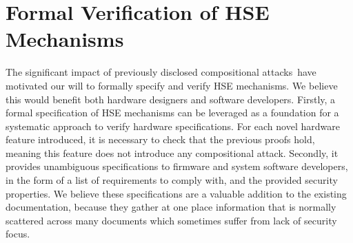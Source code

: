 \section{Formal Verification of HSE Mechanisms}
\label{sec:intro:verif}

The significant impact of previously disclosed compositional
attacks\,\cite{duflot2009smram,wojtczuk2009smram,domas2015sinkhole,kallenberg2015racecondition,kovah2015senter}
have motivated our will to formally specify and verify HSE mechanisms.
%
We believe this would benefit both hardware designers and software developers.
%
Firstly, a formal specification of HSE mechanisms can be leveraged as a
foundation for a systematic approach to verify hardware specifications.
%
For each novel hardware feature introduced, it is necessary to check that the
previous proofs hold, meaning this feature does not introduce any compositional
attack.
%
Secondly, it provides unambiguous specifications to firmware and system software
developers, in the form of a list of requirements to comply with, and the
provided security properties.
%
We believe these specifications are a valuable addition to the existing
documentation, because they gather at one place information that is normally
scattered across many documents which sometimes suffer from lack of security
focus.
%
%

